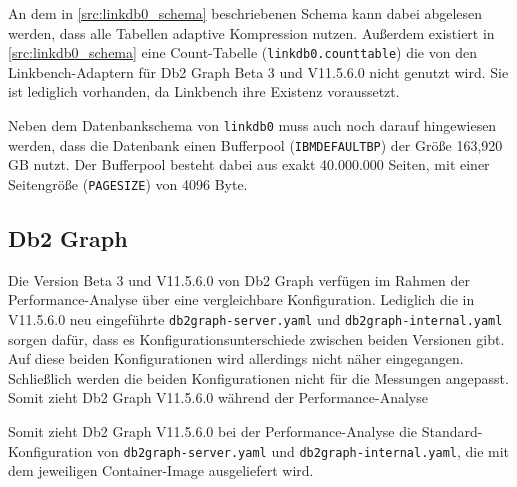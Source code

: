 An dem in \autoref{src:linkdb0_schema} beschriebenen Schema kann dabei abgelesen werden, dass alle Tabellen adaptive Kompression nutzen. Außerdem existiert in \autoref{src:linkdb0_schema} eine Count-Tabelle (\texttt{linkdb0.counttable}) die von den Linkbench-Adaptern für Db2 Graph Beta 3 und V11.5.6.0 nicht genutzt wird. Sie ist lediglich vorhanden, da Linkbench ihre Existenz voraussetzt. 

Neben dem Datenbankschema von \texttt{linkdb0} muss auch noch darauf hingewiesen werden, dass die Datenbank einen Bufferpool (\texttt{IBMDEFAULTBP}) der Größe 163,920 GB nutzt. Der Bufferpool besteht dabei aus exakt 40.000.000 Seiten, mit einer Seitengröße (\texttt{PAGESIZE}) von 4096 Byte.

\subsection{Db2 Graph}
Die Version Beta 3 und V11.5.6.0 von Db2 Graph verfügen im Rahmen der Performance-Analyse über eine vergleichbare Konfiguration. Lediglich die in V11.5.6.0 neu eingeführte \texttt{db2graph-server.yaml} und \texttt{db2graph-internal.yaml} sorgen dafür, dass es Konfigurationsunterschiede zwischen beiden Versionen gibt. Auf diese beiden Konfigurationen wird allerdings nicht näher eingegangen. Schließlich werden die beiden Konfigurationen nicht für die Messungen angepasst. Somit zieht Db2 Graph V11.5.6.0 während der Performance-Analyse 

Somit zieht Db2 Graph V11.5.6.0 bei der Performance-Analyse die Standard-Konfiguration von \texttt{db2graph-server.yaml} und \texttt{db2graph-internal.yaml}, die mit dem jeweiligen Container-Image ausgeliefert wird.


